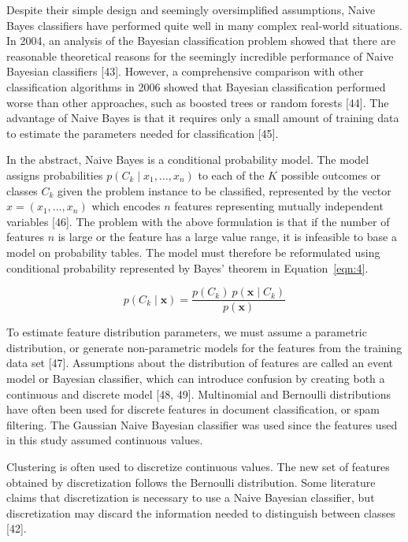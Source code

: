 \documentclass[sn-mathphys-num]{sn-jnl}%
\begin{document}
Despite their simple design and seemingly oversimplified assumptions, Naive Bayes classifiers have performed quite well in many complex real-world situations. In 2004, an analysis of the Bayesian classification problem showed that there are reasonable theoretical reasons for the seemingly incredible performance of Naive Bayesian classifiers [43]. However, a comprehensive comparison with other classification algorithms in 2006 showed that Bayesian classification performed worse than other approaches, such as boosted trees or random forests [44]. The advantage of Naive Bayes is that it requires only a small amount of training data to estimate the parameters needed for classification [45].

In the abstract, Naive Bayes is a conditional probability model. The model assigns probabilities $p(C_{k}\mid x_{1},\ldots, x_{n})$ to each of the $K$ possible outcomes or classes $C_{k}$ given the problem instance to be classified, represented by the vector $x = (x_{1},\ldots, x_{n})$ which encodes $n$ features representing mutually independent variables [46]. The problem with the above formulation is that if the number of features $n$ is large or the feature has a large value range, it is infeasible to base a model on probability tables. The model must therefore be reformulated using conditional probability represented by Bayes' theorem in Equation~\ref{eqn:4}.

\begin{equation}
	p(C_{k}\mid \mathbf{x})={\frac{p(C_{k})\ p(\mathbf{x} \mid C_{k})}{p(\mathbf{x})}}
	\label{eqn:4}
\end{equation}

To estimate feature distribution parameters, we must assume a parametric distribution, or generate non-parametric models for the features from the training data set [47]. Assumptions about the distribution of features are called an event model or Bayesian classifier, which can introduce confusion by creating both a continuous and discrete model [48, 49]. Multinomial and Bernoulli distributions have often been used for discrete features in document classification, or spam filtering. The Gaussian Naive Bayesian classifier was used since the features used in this study assumed continuous values.

Clustering is often used to discretize continuous values. The new set of features obtained by discretization follows the Bernoulli distribution. Some literature claims that discretization is necessary to use a Naive Bayesian classifier, but discretization may discard the information needed to distinguish between classes [42].
\end{document}
